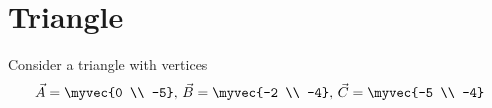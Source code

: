 \documentclass[11pt]{book}
\begin{document}
\frontmatter


\subtitle{Through Algebra}


\titlepage

\tableofcontents

\setcounter{page}{0}

\mainmatter

\chapter{Triangle}
Consider a triangle with vertices
\begin{align}
\vec{A} = \myvec{0 \\ -5},\,
\vec{B} = \myvec{-2 \\ -4},\,
\vec{C} = \myvec{-5 \\ -4}
\end{align}
\end{document}
